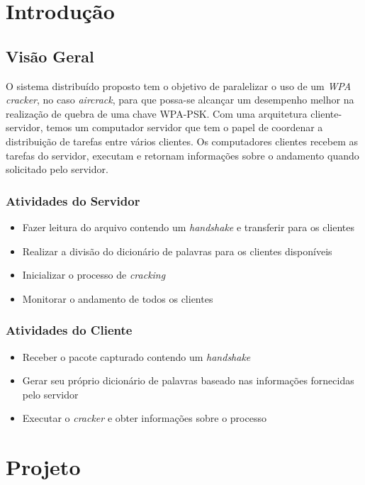 \documentclass[12pt,a4paper]{abnt}
\begin{document}
\tableofcontents
\listoffigures
\clearpage

\chapter{Introdução}
	\section{Visão Geral}
		O sistema distribuído proposto tem o objetivo de paralelizar o uso de um \emph{WPA cracker}, no caso \emph{aircrack}, para que possa-se alcançar um desempenho melhor na realização de quebra de uma chave WPA-PSK. Com uma arquitetura cliente-servidor, 
		temos um computador servidor que tem o papel de coordenar a distribuição de tarefas entre vários clientes. Os computadores clientes recebem as tarefas do servidor, executam e retornam informações sobre o andamento quando solicitado pelo servidor.
		
		\subsection{Atividades do Servidor}
		\begin{itemize}
			\item Fazer leitura do arquivo contendo um \emph{handshake} e transferir para os clientes 
			\item Realizar a divisão do dicionário de palavras para os clientes disponíveis
			\item Inicializar o processo de \emph{cracking}
			\item Monitorar o andamento de todos os clientes
		\end{itemize}
		
		\subsection{Atividades do Cliente}
		\begin{itemize}
			\item Receber o pacote capturado contendo um \emph{handshake}
			\item Gerar seu próprio dicionário de palavras baseado nas informações fornecidas pelo servidor
			\item Executar o \emph{cracker} e obter informações sobre o processo
		\end{itemize}

	\clearpage
\chapter{Projeto}
\end{document}
